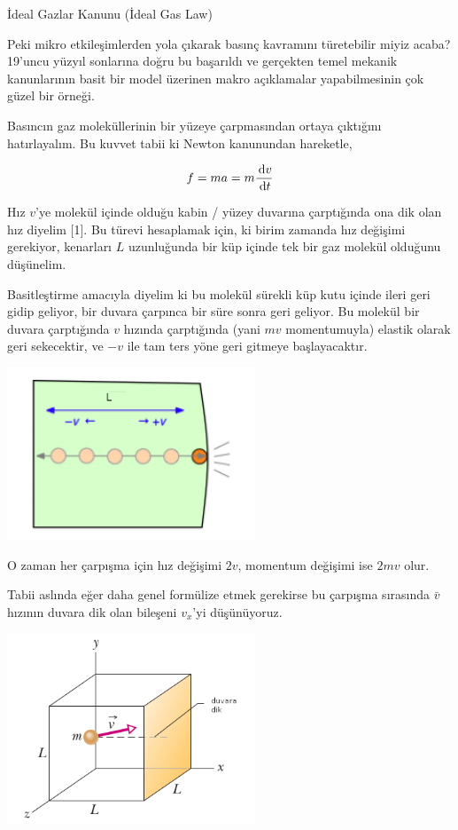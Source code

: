 \documentclass[12pt,fleqn]{article}\usepackage{../../common}
\begin{document}
İdeal Gazlar Kanunu (İdeal Gas Law)

Peki mikro etkileşimlerden yola çıkarak basınç kavramını türetebilir miyiz
acaba? 19'uncu yüzyıl sonlarına doğru bu başarıldı ve gerçekten temel mekanik
kanunlarının basit bir model üzerinen makro açıklamalar yapabilmesinin çok güzel
bir örneği.

Basıncın gaz moleküllerinin bir yüzeye çarpmasından ortaya çıktığını
hatırlayalım. Bu kuvvet tabii ki Newton kanunundan hareketle,

$$
f = m a = m \frac{\,\mathrm{d} v}{\,\mathrm{d} t}
$$

Hız $v$'ye molekül içinde olduğu kabin / yüzey duvarına çarptığında ona dik olan
hız diyelim [1]. Bu türevi hesaplamak için, ki birim zamanda hız değişimi
gerekiyor, kenarları $L$ uzunluğunda bir küp içinde tek bir gaz molekül olduğunu
düşünelim.

Basitleştirme amacıyla diyelim ki bu molekül sürekli küp kutu içinde ileri geri
gidip geliyor, bir duvara çarpınca bir süre sonra geri geliyor. Bu molekül bir
duvara çarptığında $v$ hızında çarptığında (yani $mv$ momentumuyla) elastik
olarak geri sekecektir, ve $-v$ ile tam ters yöne geri gitmeye başlayacaktır.

\includegraphics[width=20em]{phy_005_basics_04.png}

O zaman her çarpışma için hız değişimi $2v$, momentum değişimi ise $2mv$
olur.

Tabii aslında eğer daha genel formülize etmek gerekirse bu çarpışma sırasında
$\bar{v}$ hızının duvara dik olan bileşeni $v_x$'yi düşünüyoruz.

\includegraphics[width=20em]{phy_005_basics_05.png}
\end{document}
